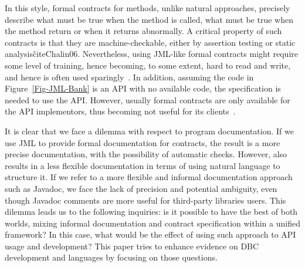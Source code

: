 In this style, formal contracts for methods, unlike natural approaches, precisely describe what must be true when the method is called, what must be true when the method return or when it returns abnormally. A critical property of such contracts is that they are machine-checkable, either by assertion testing or static analysis\~cite{Chalin06}.
Nevertheless, using JML-like formal contracts might require some level of training, hence becoming, to some extent, hard to read and write, and hence is often used sparingly~\cite{Chalin06,Polikarpova-etal09,typeContracts}.
In addition, assuming the code in Figure~\ref{Fig-JML-Bank} is an API with no available code, the specification is needed to use the API. However, usually formal contracts are only available for the API implementors, thus becoming not useful for its clients~\cite{Parnas2011}.


It is clear that we face a dilemma with respect to program documentation. If we use JML to provide formal documentation for contracts, the result is a more precise documentation, with the possibility of automatic checks. However, also results in a less flexible documentation in terms of using natural language to structure it.
If we refer to a more flexible and informal documentation approach such as Javadoc, we face the lack of precision and potential ambiguity, even though Javadoc comments are more useful for third-party libraries users. This dilemma leads us to the following  inquiries: is it possible to have the best of both worlds, mixing informal documentation and contract specification within a unified framework? In this case, what would be the effect of using such approach to API usage and development? This paper tries to enhance evidence on DBC development and languages by focusing on those questions.

